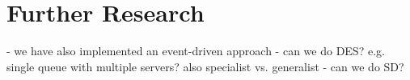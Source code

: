 \section{Further Research}
- we have also implemented an event-driven approach
- can we do DES? e.g. single queue with multiple servers? also specialist vs. generalist
- can we do SD?
